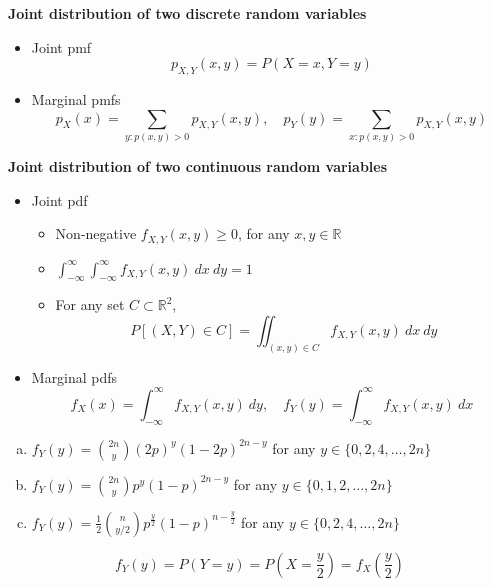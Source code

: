 \documentclass[slidestop,compress,mathserif]{beamer}
\begin{document}
\begin{frame}%

{\bf Joint distribution of two discrete random variables}
\begin{itemize}
\item Joint pmf
\[p_{X, Y}(x, y) = P(X=x,Y=y) \]
\item Marginal pmfs
\[p_X(x) = \sum_{y: p(x, y) > 0} p_{X, Y}(x,y), \quad p_Y(y) = \sum_{x: p(x, y) > 0} p_{X, Y}(x,y)  \]
\end{itemize}

{\bf Joint distribution of two continuous random variables }
\begin{itemize}
\item Joint pdf
  \begin{itemize}
  \item Non-negative $f_{X, Y}(x, y) \geq 0$, for any $x, y \in \mathbb{R}$
  \item $\int_{-\infty}^{\infty} \int_{-\infty}^{\infty} f_{X, Y}(x,y) ~dx~dy = 1$
  \item For any set $C \subset \mathbb{R}^2$,
  \[ P[(X, Y) \in C] = \iint_{(x, y) \in C} f_{X, Y}(x,y) ~dx~dy\]
  \end{itemize}
\item Marginal pdfs
\[ f_X(x) = \int_{-\infty}^\infty f_{X, Y}(x,y)~dy, \quad f_Y(y) = \int_{-\infty}^\infty f_{X, Y}(x,y)~dx \]
\end{itemize}


\end{frame}


\begin{frame}%


\begin{enumerate}[(a)]
\item $f_Y(y) = {2n \choose y}(2p)^y (1-2p)^{2n - y}$ for any $y \in \{0, 2, 4, \ldots, 2n\}$
\item $f_Y(y) = {2n \choose y}p^y (1-p)^{2n - y}$ for any $y \in \{0, 1, 2, \ldots, 2n\}$
\item $f_Y(y) = \frac{1}{2}{n \choose y/2}p^{\frac{y}{2}} (1-p)^{n - \frac{y}{2}}$ for any $y \in \{0, 2, 4, \ldots, 2n\}$
\end{enumerate}

\pause
\[ f_Y(y) = P(Y = y) = P\left(X = \frac{y}{2}\right) = f_X\left(\frac{y}{2}\right) \]


\end{frame}
\end{document}
